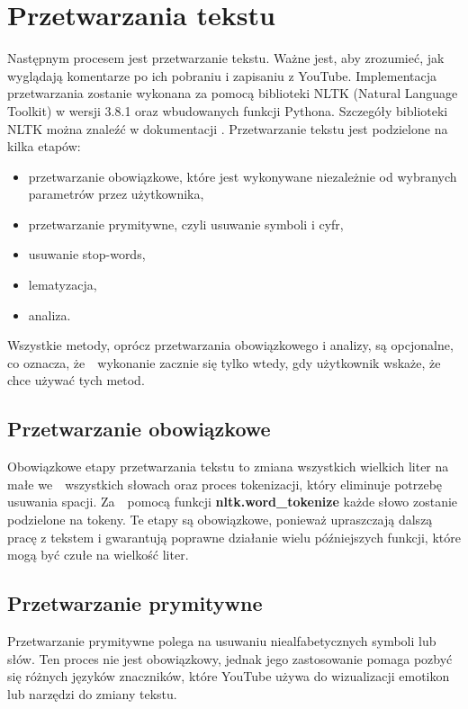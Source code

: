 \section{Przetwarzania tekstu}


		Następnym procesem jest przetwarzanie tekstu. Ważne jest, aby zrozumieć, jak wyglądają komentarze po ich pobraniu i zapisaniu z YouTube. Implementacja przetwarzania zostanie wykonana za pomocą biblioteki NLTK (Natural Language Toolkit) w wersji 3.8.1 oraz wbudowanych funkcji Pythona. Szczegóły biblioteki NLTK można znaleźć w dokumentacji \cite{nltk}. Przetwarzanie tekstu jest podzielone na kilka etapów:
		\begin{itemize}
			\item przetwarzanie obowiązkowe, które jest wykonywane niezależnie od wybranych parametrów przez użytkownika,
			\item przetwarzanie prymitywne, czyli usuwanie symboli i cyfr,
			\item usuwanie stop-words,
			\item lematyzacja,
			\item analiza.
		\end{itemize}
		Wszystkie metody, oprócz przetwarzania obowiązkowego i analizy, są opcjonalne, co oznacza, że~~wykonanie zacznie się tylko wtedy, gdy użytkownik wskaże, że chce używać tych metod.
		
	\subsection{Przetwarzanie obowiązkowe}
		Obowiązkowe etapy przetwarzania tekstu to zmiana wszystkich wielkich liter na małe we~~wszystkich słowach oraz proces tokenizacji, który eliminuje potrzebę usuwania spacji. Za~~pomocą funkcji \textbf{nltk.word\_tokenize} każde słowo zostanie podzielone na tokeny. Te etapy są obowiązkowe, ponieważ upraszczają dalszą pracę z tekstem i gwarantują poprawne działanie wielu późniejszych funkcji, które mogą być czułe na wielkość liter.
	
		
	\subsection{Przetwarzanie prymitywne}
		Przetwarzanie prymitywne polega na usuwaniu niealfabetycznych symboli lub słów. Ten proces nie jest obowiązkowy, jednak jego zastosowanie pomaga pozbyć się różnych języków znaczników, które YouTube używa do wizualizacji emotikon lub narzędzi do zmiany tekstu.

